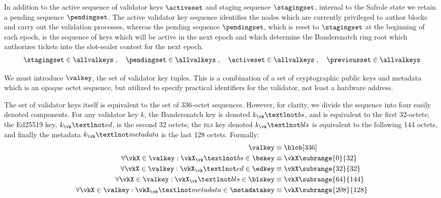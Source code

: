 In addition to the active sequence of validator keys $\activeset$ and staging sequence $\stagingset$, internal to the Safrole state we retain a pending sequence $\pendingset$. The active validator key sequence identifies the nodes which are currently privileged to author blocks and carry out the validation processes, whereas the pending sequence $\pendingset$, which is reset to $\stagingset$ at the beginning of each epoch, is the sequence of keys which will be active in the next epoch and which determine the Bandersnatch ring root which authorizes tickets into the slot-sealer contest for the next epoch.
\begin{align}
  \label{eq:validatorkeys}
  \stagingset \in \allvalkeys \;,\quad
  \pendingset \in \allvalkeys \;,\quad
  \activeset \in \allvalkeys \;,\quad
  \previousset \in \allvalkeys
\end{align}

We must introduce $\valkey$, the set of validator key tuples. This is a combination of a set of cryptographic public keys and metadata which is an opaque octet sequence, but utilized to specify practical identifiers for the validator, not least a hardware address.

The set of validator keys itself is equivalent to the set of 336-octet sequences. However, for clarity, we divide the sequence into four easily denoted components. For any validator key $k$, the Bandersnatch key is denoted $k_\vk¬bs$, and is equivalent to the first 32-octets; the Ed25519 key, $k_\vk¬ed$, is the second 32 octets; the \textsc{bls} key denoted $k_\vk¬bls$ is equivalent to the following 144 octets, and finally the metadata $k_\vk¬metadata$ is the last 128 octets. Formally:
\begin{align}
  \valkey &\equiv \blob[336] \\
  \forall \vkX \in \valkey : \vkX_\vk¬bs \in \bskey &\equiv \vkX\subrange{0}{32} \\
  \forall \vkX \in \valkey : \vkX_\vk¬ed \in \edkey &\equiv \vkX\subrange{32}{32} \\
  \forall \vkX \in \valkey : \vkX_\vk¬bls \in \blskey &\equiv \vkX\subrange{64}{144} \\
  \forall \vkX \in \valkey : \vkX_\vk¬metadata \in \metadatakey &\equiv \vkX\subrange{208}{128}
\end{align}

